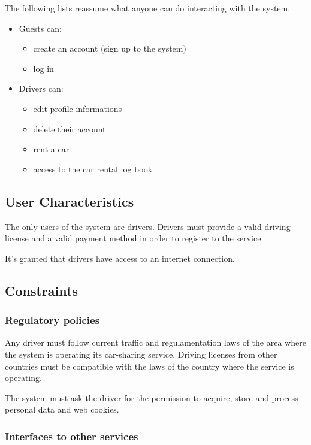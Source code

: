 The following lists reassume what anyone can do interacting with the system.
\begin{itemize}
	\item Guests can:
	\begin{itemize}
		\item create an account (sign up to the system)
		\item log in
	\end{itemize}
	\item Drivers can:
	\begin{itemize}
		\item edit profile informations
		\item delete their account
		\item rent a car
		\item access to the car rental log book
	\end{itemize}
\end{itemize}

\subsection{User Characteristics}

The only users of the system are drivers. Drivers must provide a valid driving license and a valid payment method in order to register to the service.

It's granted that drivers have access to an internet connection.

\subsection{Constraints}

\subsubsection{Regulatory policies}
Any driver must follow current traffic and regulamentation laws of the area where the system is operating its car-sharing service. Driving licenses from other countries must be compatible with the laws of the country where the service is operating.

The system must ask the driver for the permission to acquire, store and process personal data and web cookies.

\subsubsection{Interfaces to other services}

